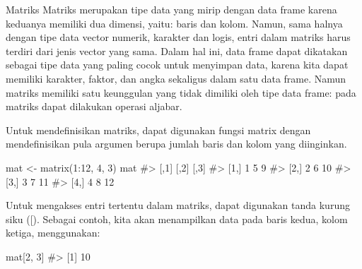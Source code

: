 \documentclass[
]{article}
\begin{document}
Matriks Matriks merupakan tipe data yang mirip dengan data frame karena
keduanya memiliki dua dimensi, yaitu: baris dan kolom. Namun, sama
halnya dengan tipe data vector numerik, karakter dan logis, entri dalam
matriks harus terdiri dari jenis vector yang sama. Dalam hal ini, data
frame dapat dikatakan sebagai tipe data yang paling cocok untuk
menyimpan data, karena kita dapat memiliki karakter, faktor, dan angka
sekaligus dalam satu data frame. Namun matriks memiliki satu keunggulan
yang tidak dimiliki oleh tipe data frame: pada matriks dapat dilakukan
operasi aljabar.

Untuk mendefinisikan matriks, dapat digunakan fungsi matrix dengan
mendefinisikan pula argumen berupa jumlah baris dan kolom yang
diinginkan.

mat \textless- matrix(1:12, 4, 3) mat \#\textgreater{} {[},1{]} {[},2{]}
{[},3{]} \#\textgreater{} {[}1,{]} 1 5 9 \#\textgreater{} {[}2,{]} 2 6
10 \#\textgreater{} {[}3,{]} 3 7 11 \#\textgreater{} {[}4,{]} 4 8 12

Untuk mengakses entri tertentu dalam matriks, dapat digunakan tanda
kurung siku ({[}). Sebagai contoh, kita akan menampilkan data pada baris
kedua, kolom ketiga, menggunakan:

mat{[}2, 3{]} \#\textgreater{} {[}1{]} 10
\end{document}
